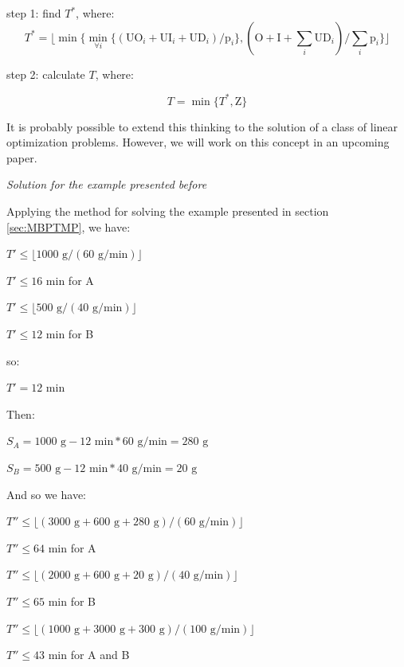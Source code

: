 \documentclass[authoryear,manuscript,12pt]{elsarticle}
\begin{document}
step 1: find $T^*$, where:
\begin{equation}
T^* = \lfloor{\min \{\min_{\forall i} \{(\textrm{UO}_i + \textrm{UI}_i + \textrm{UD}_i) / \textrm{p}_i\},(\textrm{O} + \textrm{I} + \sum_i \textrm{UD}_i) / \sum_i {\textrm{p}_i}\}}\rfloor
\end{equation}

step 2: calculate $T$, where: 

\begin{equation}
T = \min \{T^* , \textrm{Z}\}
\end{equation}

It is probably possible to extend this thinking to the solution of a class of linear optimization problems. However, we will work on this concept in an upcoming paper.

\emph{Solution for the example presented before}

Applying the method for solving the example presented in section \ref{sec:MBPTMP}, we have:

$T' \leq \lfloor{1000 \textrm{ g} / (60 \textrm{ g}/\textrm{min})}\rfloor$ 

$T' \leq 16 \textrm{ min}$ \quad for A

$T' \leq \lfloor{500 \textrm{ g} / (40 \textrm{ g}/\textrm{min})}\rfloor$

$T' \leq 12 \textrm{ min}$ \quad for B

so:

$T' = 12 \textrm{ min}$ 

Then:

$S_A = 1000 \textrm{ g} - 12 \textrm{ min} * 60 \textrm{ g}/\textrm{min} = 280 \textrm{ g}$

$S_B = 500 \textrm{ g} - 12 \textrm{ min} * 40 \textrm{ g}/\textrm{min} = 20 \textrm{ g}$

And so we have:

$T'' \leq \lfloor{(3000 \textrm{ g} + 600 \textrm{ g} + 280 \textrm{ g}) / (60 \textrm{ g}/\textrm{min})}\rfloor$

$T'' \leq 64 \textrm{ min}$ \quad for A

$T'' \leq \lfloor{(2000 \textrm{ g} + 600 \textrm{ g} + 20 \textrm{ g}) / (40 \textrm{ g}/\textrm{min})}\rfloor$

$T'' \leq 65 \textrm{ min}$ \quad for B

$T'' \leq \lfloor{(1000 \textrm{ g} + 3000 \textrm{ g} + 300 \textrm{ g}) / (100 \textrm{ g}/\textrm{min})}\rfloor$

$T'' \leq 43 \textrm{ min}$ \quad for A and B
\end{document}
